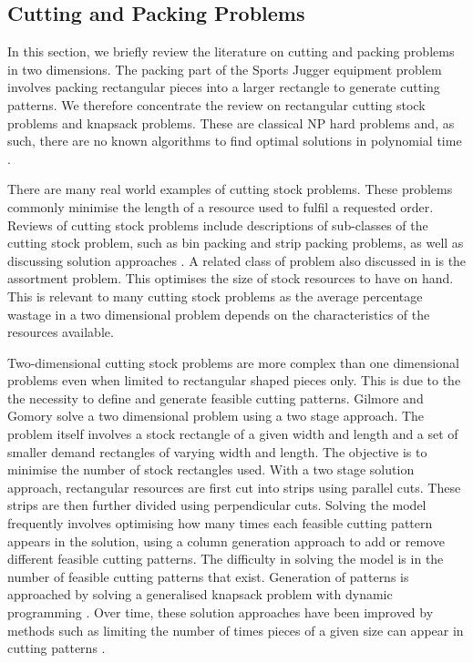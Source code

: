 \documentclass[10pt,a4paper]{article}
\begin{document}
\subsection{Cutting and Packing Problems}

In this section, we briefly review the literature on cutting and packing problems in two dimensions. The packing part of the Sports Jugger equipment problem involves packing rectangular pieces into a larger rectangle to generate cutting patterns. We therefore concentrate the review on rectangular cutting stock problems and knapsack problems.  These are classical NP hard problems and, as such, there are no known algorithms to find optimal solutions in polynomial time \cite{Kenyon2000} \cite{Leung2012}. 

There are many real world examples of cutting stock problems. These problems commonly minimise the length of a resource used to fulfil a requested order.  Reviews of cutting stock problems include descriptions of sub-classes of the cutting stock problem, such as bin packing and strip packing problems, as well as discussing solution approaches \cite{haessler1991} \cite{Lodi2002} \cite{Cheng}. A related class of problem also discussed in \cite{Cheng} is the assortment problem. This optimises the size of stock resources to have on hand. This is relevant to many cutting stock problems as the average percentage wastage in a two dimensional problem depends on the characteristics of the resources available.

Two-dimensional cutting stock problems are more complex than one dimensional problems even when limited to rectangular shaped pieces only. This is due to the the necessity to define and generate feasible cutting patterns. Gilmore and Gomory \cite{GilmoreGomory} solve a two dimensional problem using a two stage approach. The problem itself involves a stock rectangle of a given width and length and a set of smaller demand rectangles of varying width and length. The objective is to minimise the number of stock rectangles used. With a two stage solution approach, rectangular resources are first cut into strips using parallel cuts. These strips are then further divided using perpendicular cuts. Solving the model frequently involves optimising how many times each feasible cutting pattern appears in the solution, using a column generation approach to add or remove different feasible cutting patterns. The difficulty in solving the model is in the number of feasible cutting patterns that exist. Generation of patterns is approached by solving a generalised knapsack problem with dynamic programming \cite{GilmoreGomory} \cite{haessler1991} \cite{Cintra2008}. Over time, these solution approaches have been improved by methods such as limiting the number of times pieces of a given size can appear in cutting patterns \cite{haessler1991}. 
\end{document}

